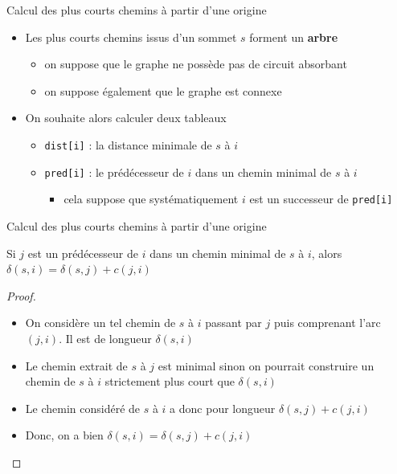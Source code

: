 \begin{frame}{Calcul des plus courts chemins à partir d'une origine}
    \begin{itemize}
        \item Les plus courts chemins issus d'un sommet $s$ forment un \textbf{arbre}
        \begin{itemize}
            \item on suppose que le graphe ne possède pas de circuit absorbant
            \item on suppose également que le graphe est connexe 
        \end{itemize}  
        \item On souhaite alors calculer deux tableaux 
        \begin{itemize}
            \item \texttt{dist[i]} : la distance minimale de $s$ à $i$
            \item \texttt{pred[i]} : le prédécesseur de $i$ dans un chemin minimal de $s$ à $i$
            \begin{itemize}
                \item cela suppose que systématiquement $i$ est un successeur de \texttt{pred[i]}
            \end{itemize}
        \end{itemize}
    \end{itemize}
\end{frame}

\begin{frame}{Calcul des plus courts chemins à partir d'une origine}
    \begin{theorem}
        Si $j$ est un prédécesseur de $i$ dans un chemin minimal de $s$ à $i$, alors $\delta(s,i) = \delta(s,j)+c(j,i)$
    \end{theorem}
        \begin{proof}
            \begin{itemize}
            \item On considère un tel chemin de $s$ à $i$ passant par $j$ puis comprenant l'arc $(j,i)$. Il est de longueur $\delta(s,i)$
            \item Le chemin extrait de $s$ à $j$ est minimal sinon on pourrait construire un chemin de $s$ à $i$ strictement plus court que $\delta(s,i)$
            \item Le chemin considéré de $s$ à $i$ a donc pour longueur $\delta(s,j)+c(j,i)$
            \item Donc, on a bien $\delta(s,i) = \delta(s,j)+c(j,i)$
        \end{itemize}
    \end{proof}
\end{frame}


